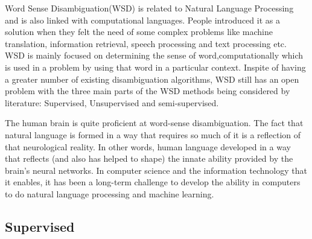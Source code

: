 Word Sense Disambiguation(WSD) is related to Natural Language Processing and is also linked with computational languages. 
People introduced it as a solution when they felt the need of some complex problems like machine translation, information retrieval, speech processing and text processing etc. 
WSD is mainly focused on determining the sense of word,computationally which is used in a problem by using that word in a particular context. 
Inspite of having a greater number of existing disambiguation algorithms, WSD still has an open problem with the three main parts of the WSD methods being considered by literature: Supervised, Unsupervised and semi-supervised. 

The human brain is quite proficient at word-sense disambiguation. The fact that natural language is formed in a way that requires so much of it is a reflection of that neurological reality. 
In other words, human language developed in a way that reflects (and also has helped to shape) the innate ability provided by the brain's neural networks. 
In computer science and the information technology that it enables, it has been a long-term challenge to develop the ability in computers to do natural language processing and machine learning. 

\subsection*{Supervised}

